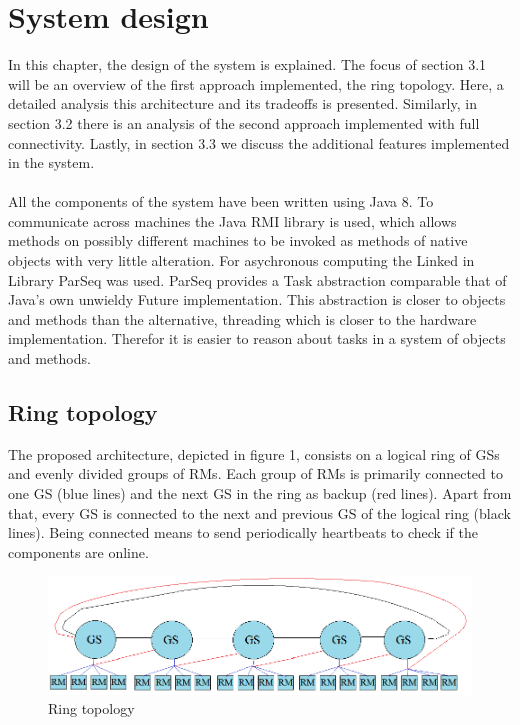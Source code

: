 \section{System design}
In this chapter, the design of the system is explained.
The focus of section 3.1 will be an overview of the first approach implemented, the ring topology. Here, a detailed analysis this architecture and its tradeoffs is presented. Similarly, in section 3.2 there is an analysis of the second approach implemented with full connectivity. Lastly, in section 3.3 we discuss the additional features implemented in the system. \\\\
All the components of the system have been written using Java 8.
To communicate across machines the Java RMI library is used, which
allows methods on possibly different machines to be invoked as methods
of native objects with very little alteration.
For asychronous computing the Linked in Library ParSeq was used.
ParSeq provides a Task abstraction comparable that of Java's own
unwieldy Future implementation.
This abstraction is closer to objects and methods than the
alternative, threading which is closer to the hardware implementation.
Therefor it is easier to reason about tasks in a system of objects and methods.

\subsection{Ring topology}

The proposed architecture, depicted in figure 1, consists on a logical ring of GSs and evenly divided groups of RMs.
Each group of RMs is primarily connected to one GS (blue lines) and the next GS in the ring as backup (red lines). Apart from that, every GS is connected to the next and previous GS of the logical ring (black lines). Being connected means to send periodically heartbeats to check if the components are online. 
\\ 
\begin{figure}[H]
\centering
	\includegraphics[scale=0.61]{ring.png}
	\caption{Ring topology}
\end{figure}

